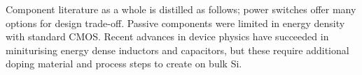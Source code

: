 \documentclass[letterpaper,twocolumn,10pt]{article}
\begin{document}
\indent Component literature as a whole is distilled as follows; power switches offer many options for design trade-off. Passive components were limited in energy density with standard CMOS. Recent advances in device physics have succeeded in miniturising energy dense inductors and capacitors, but these require additional doping material and process steps to create on bulk Si.\\


\end{document}
